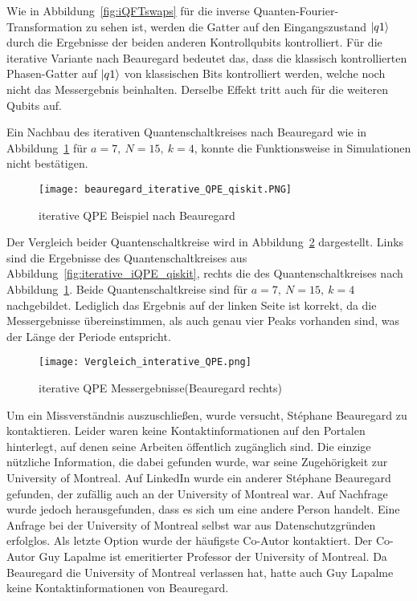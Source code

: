 Wie in Abbildung~\ref{fig:iQFTswaps} für die inverse Quanten-Fourier-Transformation zu sehen ist, 
werden die Gatter auf den Eingangszustand \(\ket{q1}\) durch die Ergebnisse der beiden anderen Kontrollqubits kontrolliert.
Für die iterative Variante nach Beauregard bedeutet das, 
dass die klassisch kontrollierten Phasen-Gatter auf \(\ket{q1}\) von klassischen Bits kontrolliert werden, 
welche noch nicht das Messergebnis beinhalten.
Derselbe Effekt tritt auch für die weiteren Qubits auf.

Ein Nachbau des iterativen Quantenschaltkreises nach Beauregard wie in Abbildung~\ref{fig:iterative_iQPE_Beauregard_qiskit} für \(a = 7,~N=15,~k=4\), 
konnte die Funktionsweise in Simulationen nicht bestätigen.
\begin{figure}[H]
  \centering
  \texttt{[image: beauregard\_iterative\_QPE\_qiskit.PNG]}
  \caption{iterative QPE Beispiel nach Beauregard}
  \label{fig:iterative_iQPE_Beauregard_qiskit}
\end{figure}
Der Vergleich beider Quantenschaltkreise wird in Abbildung~\ref{fig:iterative_iQPE_Vergleich} dargestellt.
Links sind die Ergebnisse des Quantenschaltkreises aus Abbildung~\ref{fig:iterative_iQPE_qiskit}, 
rechts die des Quantenschaltkreises nach Abbildung~\ref{fig:iterative_iQPE_Beauregard_qiskit}.
Beide Quantenschaltkreise sind für \(a = 7,~N=15,~k=4\) nachgebildet.
Lediglich das Ergebnis auf der linken Seite ist korrekt, 
da die Messergebnisse übereinstimmen, 
als auch genau vier Peaks vorhanden sind, 
was der Länge der Periode entspricht.
\begin{figure}[H]
  \centering
  \texttt{[image: Vergleich\_interative\_QPE.png]}
  \caption{iterative QPE Messergebnisse(Beauregard rechts)}
  \label{fig:iterative_iQPE_Vergleich}
\end{figure}

Um ein Missverständnis auszuschließen, wurde versucht, Stéphane Beauregard zu kontaktieren. 
Leider waren keine Kontaktinformationen auf den Portalen hinterlegt, 
auf denen seine Arbeiten öffentlich zugänglich sind. 
Die einzige nützliche Information, die dabei gefunden wurde, 
war seine Zugehörigkeit zur University of Montreal. 
Auf LinkedIn wurde ein anderer Stéphane Beauregard gefunden, 
der zufällig auch an der University of Montreal war. Auf Nachfrage wurde jedoch herausgefunden, 
dass es sich um eine andere Person handelt. 
Eine Anfrage bei der University of Montreal selbst war aus Datenschutzgründen erfolglos. 
Als letzte Option wurde der häufigste Co-Autor kontaktiert. 
Der Co-Autor Guy Lapalme ist emeritierter Professor der University of Montreal.
Da Beauregard die University of Montreal verlassen hat, 
hatte auch Guy Lapalme keine Kontaktinformationen von Beauregard.

